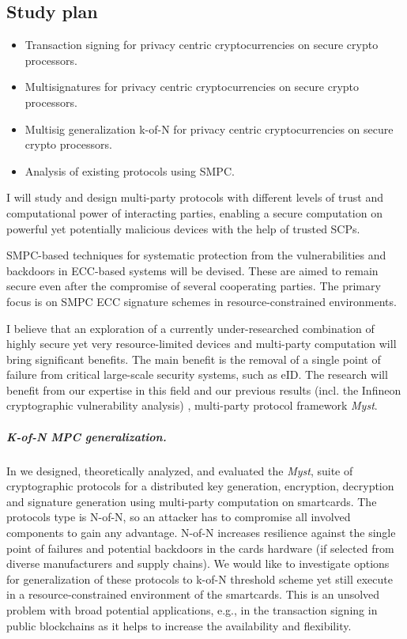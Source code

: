\documentclass[
  digital, %
  twoside, %
  table,   %
  lof,     %
  lot,     %
]{fithesis3}
\newcounter{ph4_show_guides}
\theoremstyle{definition}
\theoremstyle{remark}
\begin{document}
\begin{ecmmnt}  %
\chapter{Study plan}
\begin{itemize}
	\item Transaction signing for privacy centric cryptocurrencies on secure crypto processors.  
    \item Multisignatures for privacy centric cryptocurrencies on secure crypto processors. 
    \item Multisig generalization k-of-N for privacy centric cryptocurrencies on secure crypto processors. 
    \item Analysis of existing protocols using SMPC. 
\end{itemize}

I will study and design multi-party protocols with different levels of trust and computational power of interacting parties, enabling a secure computation on powerful yet potentially malicious devices with the help of trusted SCPs.

SMPC-based techniques for systematic protection from the vulnerabilities and backdoors in ECC-based systems will be devised. These are aimed to remain secure even after the compromise of several cooperating parties. The primary focus is on SMPC ECC signature schemes in resource-constrained environments.

I believe that an exploration of a currently under-researched combination of highly secure yet very resource-limited devices and multi-party computation will bring significant benefits. The main benefit is the removal of a single point of failure from critical large-scale security systems, such as eID. The research will benefit from our expertise in this field and our previous results (incl. the Infineon cryptographic vulnerability analysis) \cite{2017-ccs-mavroudis, 2017-ccs-nemec}, multi-party protocol framework \emph{Myst}.

\paragraph{K-of-N MPC generalization.} In \cite{2017-ccs-mavroudis} we designed, theoretically analyzed, and evaluated the \emph{Myst}, suite of cryptographic protocols for a distributed key generation, encryption, decryption and signature generation using multi-party computation on smartcards. The protocols type is N-of-N, so an attacker has to compromise all involved components to gain any advantage. N-of-N increases resilience against the single point of failures and potential backdoors in the cards hardware (if selected from diverse manufacturers and supply chains). We would like to investigate options for generalization of these protocols to k-of-N threshold scheme yet still execute in a resource-constrained environment of the smartcards. This is an unsolved problem with broad potential applications, e.g., in the transaction signing in public blockchains as it helps to increase the availability and flexibility.  



\end{ecmmnt}
\end{document}
